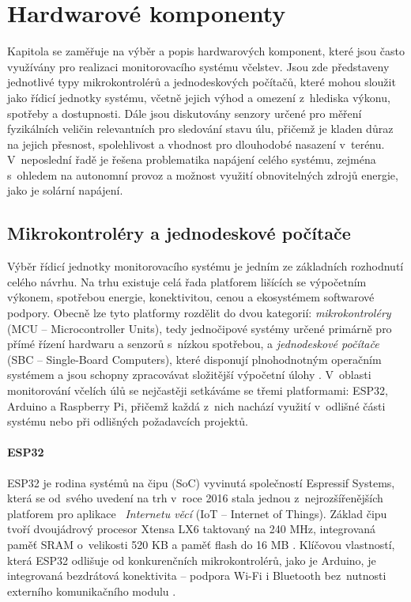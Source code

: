 \chapter{Hardwarové komponenty} \label{sec:hardware}
Kapitola se zaměřuje na výběr a popis hardwarových komponent, které jsou často využívány pro realizaci monitorovacího systému včelstev. Jsou zde představeny jednotlivé typy mikrokontrolérů a jednodeskových počítačů, které mohou sloužit jako řídicí jednotky systému, včetně jejich výhod a omezení z~hlediska výkonu, spotřeby a dostupnosti. Dále jsou diskutovány senzory určené pro měření fyzikálních veličin relevantních pro sledování stavu úlu, přičemž je kladen důraz na jejich přesnost, spolehlivost a vhodnost pro dlouhodobé nasazení v~terénu. V~neposlední řadě je řešena problematika napájení celého systému, zejména s~ohledem na autonomní provoz a možnost využití obnovitelných zdrojů energie, jako je solární napájení.

\section{Mikrokontroléry a jednodeskové počítače}
Výběr řídicí jednotky monitorovacího systému je jedním ze základních rozhodnutí celého návrhu. Na trhu existuje celá řada platforem lišících se výpočetním výkonem, spotřebou energie, konektivitou, cenou a ekosystémem softwarové podpory. Obecně lze tyto platformy rozdělit do dvou kategorií: \textit{mikrokontroléry} (MCU -- Microcontroller Units), tedy jednočipové systémy určené primárně pro přímé řízení hardwaru a senzorů s~nízkou spotřebou, a \textit{jednodeskové počítače} (SBC -- Single-Board Computers), které disponují plnohodnotným operačním systémem a jsou schopny zpracovávat složitější výpočetní úlohy \cite{PCBSync}. V~oblasti monitorování včelích úlů se nejčastěji setkáváme se třemi platformami: ESP32, Arduino a Raspberry Pi, přičemž každá z~nich nachází využití v~odlišné části systému nebo při odlišných požadavcích projektů.

\subsubsection*{ESP32}
ESP32 je rodina systémů na čipu (SoC) vyvinutá společností Espressif Systems, která se od~svého uvedení na trh v~roce 2016 stala jednou z~nejrozšířenějších platforem pro aplikace ~\textit{Internetu věcí} (IoT -- Internet of Things). Základ čipu tvoří dvoujádrový procesor Xtensa LX6 taktovaný na 240 MHz, integrovaná paměť SRAM o~velikosti 520 KB a paměť flash do 16 MB \cite{ESP32Datasheet}. Klíčovou vlastností, která ESP32 odlišuje od konkurenčních mikrokontrolérů, jako je Arduino, je integrovaná bezdrátová konektivita -- podpora Wi-Fi i Bluetooth bez~nutnosti externího komunikačního modulu \cite{ESP32Datasheet}.

